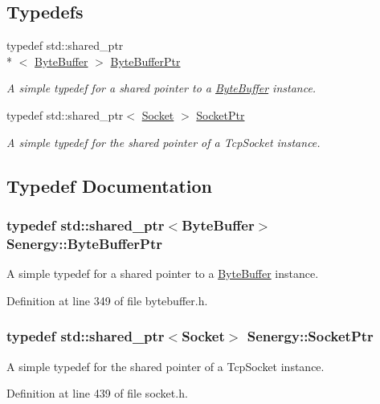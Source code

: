 \subsection*{Typedefs}
\begin{DoxyCompactItemize}
\item 
typedef std\-::shared\-\_\-ptr\\*
$<$ \hyperlink{class_senergy_1_1_byte_buffer}{Byte\-Buffer} $>$ \hyperlink{namespace_senergy_a30f5cfaeb333ffdf2c3332cc590a57ea}{Byte\-Buffer\-Ptr}
\begin{DoxyCompactList}\small\item\em A simple typedef for a shared pointer to a \hyperlink{class_senergy_1_1_byte_buffer}{Byte\-Buffer} instance. \end{DoxyCompactList}\item 
typedef std\-::shared\-\_\-ptr$<$ \hyperlink{class_senergy_1_1_socket}{Socket} $>$ \hyperlink{namespace_senergy_a9014e48a368555ba932efd8d17eb2d23}{Socket\-Ptr}
\begin{DoxyCompactList}\small\item\em A simple typedef for the shared pointer of a Tcp\-Socket instance. \end{DoxyCompactList}\end{DoxyCompactItemize}


\subsection{Typedef Documentation}
\hypertarget{namespace_senergy_a30f5cfaeb333ffdf2c3332cc590a57ea}{
\subsubsection[{Byte\-Buffer\-Ptr}]{\setlength{\rightskip}{0pt plus 5cm}typedef std\-::shared\-\_\-ptr$<${\bf Byte\-Buffer}$>$ {\bf Senergy\-::\-Byte\-Buffer\-Ptr}}}\label{namespace_senergy_a30f5cfaeb333ffdf2c3332cc590a57ea}


A simple typedef for a shared pointer to a \hyperlink{class_senergy_1_1_byte_buffer}{Byte\-Buffer} instance. 



Definition at line 349 of file bytebuffer.\-h.

\hypertarget{namespace_senergy_a9014e48a368555ba932efd8d17eb2d23}{
\subsubsection[{Socket\-Ptr}]{\setlength{\rightskip}{0pt plus 5cm}typedef std\-::shared\-\_\-ptr$<${\bf Socket}$>$ {\bf Senergy\-::\-Socket\-Ptr}}}\label{namespace_senergy_a9014e48a368555ba932efd8d17eb2d23}


A simple typedef for the shared pointer of a Tcp\-Socket instance. 



Definition at line 439 of file socket.\-h.

